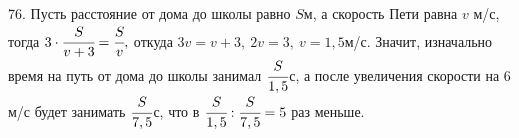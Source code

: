 76. Пусть расстояние от дома до школы равно $S$м, а скорость Пети равна $v$ м/с, тогда $3\cdot\cfrac{S}{v+3}=\cfrac{S}{v},$ откуда $3v=v+3,\ 2v=3,\ v=1,5$м/с. Значит, изначально время на путь от дома до школы занимал $\cfrac{S}{1,5}$с, а после увеличения скорости на 6 м/с будет занимать $\cfrac{S}{7,5}$с, что в $\cfrac{S}{1,5}:\cfrac{S}{7,5}=5$ раз меньше.\\

